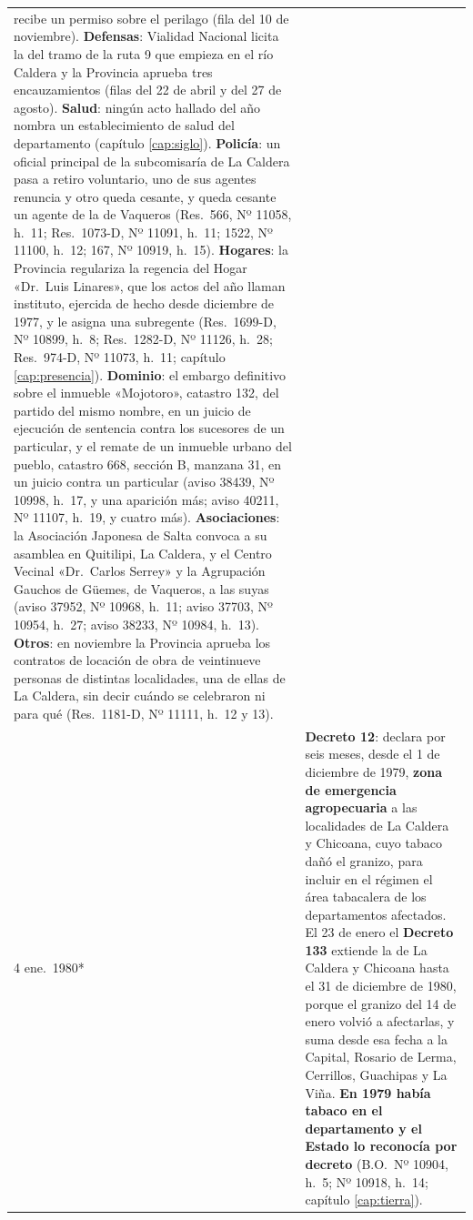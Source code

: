 \begin{longtable}{@{}p{2.7cm}p{10.3cm}@{}}
recibe un permiso sobre el perilago (fila del 10 de noviembre). \textbf{Defensas}: Vialidad Nacional licita la del tramo de la ruta 9 que empieza en el río Caldera y la Provincia aprueba tres encauzamientos (filas del 22 de abril y del 27 de agosto). \textbf{Salud}: ningún acto hallado del año nombra un establecimiento de salud del departamento (capítulo \ref{cap:siglo}). \textbf{Policía}: un oficial principal de la subcomisaría de La Caldera pasa a retiro voluntario, uno de sus agentes renuncia y otro queda cesante, y queda cesante un agente de la de Vaqueros (Res.\ 566, Nº 11058, h.\ 11; Res.\ 1073-D, Nº 11091, h.\ 11; 1522, Nº 11100, h.\ 12; 167, Nº 10919, h.\ 15). \textbf{Hogares}: la Provincia regulariza la regencia del Hogar «Dr.\ Luis Linares», que los actos del año llaman instituto, ejercida de hecho desde diciembre de 1977, y le asigna una subregente (Res.\ 1699-D, Nº 10899, h.\ 8; Res.\ 1282-D, Nº 11126, h.\ 28; Res.\ 974-D, Nº 11073, h.\ 11; capítulo \ref{cap:presencia}). \textbf{Dominio}: el embargo definitivo sobre el inmueble «Mojotoro», catastro 132, del partido del mismo nombre, en un juicio de ejecución de sentencia contra los sucesores de un particular, y el remate de un inmueble urbano del pueblo, catastro 668, sección B, manzana 31, en un juicio contra un particular (aviso 38439, Nº 10998, h.\ 17, y una aparición más; aviso 40211, Nº 11107, h.\ 19, y cuatro más). \textbf{Asociaciones}: la Asociación Japonesa de Salta convoca a su asamblea en Quitilipi, La Caldera, y el Centro Vecinal «Dr.\ Carlos Serrey» y la Agrupación Gauchos de Güemes, de Vaqueros, a las suyas (aviso 37952, Nº 10968, h.\ 11; aviso 37703, Nº 10954, h.\ 27; aviso 38233, Nº 10984, h.\ 13). \textbf{Otros}: en noviembre la Provincia aprueba los contratos de locación de obra de veintinueve personas de distintas localidades, una de ellas de La Caldera, sin decir cuándo se celebraron ni para qué (Res.\ 1181-D, Nº 11111, h.\ 12 y 13). \\
4 ene.\ 1980* & \textbf{Decreto 12}: declara por seis meses, desde el 1 de diciembre de 1979, \textbf{zona de emergencia agropecuaria} a las localidades de La Caldera y Chicoana, cuyo tabaco dañó el granizo, para incluir en el régimen el área tabacalera de los departamentos afectados. El 23 de enero el \textbf{Decreto 133} extiende la de La Caldera y Chicoana hasta el 31 de diciembre de 1980, porque el granizo del 14 de enero volvió a afectarlas, y suma desde esa fecha a la Capital, Rosario de Lerma, Cerrillos, Guachipas y La Viña. \textbf{En 1979 había tabaco en el departamento y el Estado lo reconocía por decreto} (B.O.\ Nº 10904, h.\ 5; Nº 10918, h.\ 14; capítulo \ref{cap:tierra}). \\

\end{longtable}
